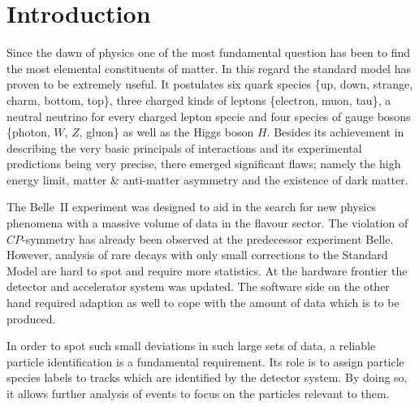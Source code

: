 \chapter{Introduction}
\label{chap:introduction}

Since the dawn of physics one of the most fundamental question has been to find the most elemental constituents of matter. In this regard the standard model has proven to be extremely useful. It postulates six quark species \{up, down, strange, charm, bottom, top\}, three charged kinds of leptons \{electron, muon, tau\}, a neutral neutrino for every charged lepton specie and four species of gauge bosons \{photon, $W$, $Z$, gluon\} as well as the Higgs boson $H$. Besides its achievement in describing the very basic principals of interactions and its experimental predictions being very precise, there emerged significant flaws; namely the high energy limit, matter \& anti-matter asymmetry and the existence of dark matter.

The Belle~\RN{2} experiment was designed to aid in the search for new physics phenomena with a massive volume of data in the flavour sector. The violation of $CP$-symmetry has already been observed at the predecessor experiment Belle. However, analysis of rare decays with only small corrections to the Standard Model are hard to spot and require more statistics. At the hardware frontier the detector and accelerator system was updated. The software side on the other hand required adaption as well to cope with the amount of data which is to be produced.

In order to spot such small deviations in such large sets of data, a reliable particle identification is a fundamental requirement. Its role is to assign particle species labels to tracks which are identified by the detector system. By doing so, it allows further analysis of events to focus on the particles relevant to them.
